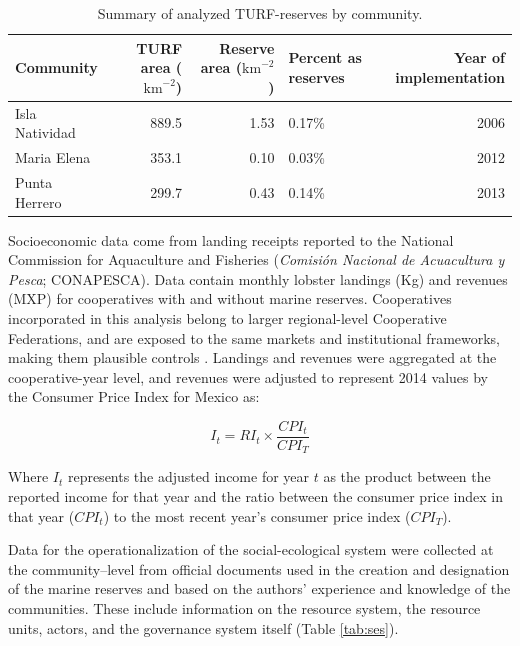 \documentclass{frontiersSCNS}
\theoremstyle{definition}
\theoremstyle{definition}
\theoremstyle{definition}
\theoremstyle{remark}
\begin{document}
\clearpage

\begin{table}[H]

\caption{\label{tab:unnamed-chunk-2}\label{table:com_sum} Summary of analyzed TURF-reserves by community.}
\centering
\begin{tabular}[t]{l|r|r|l|r}
\hline
Community & TURF area ($\mathrm{km}^{-2}$) & Reserve area ($\mathrm{km}^{-2}$) & Percent as reserves & Year of implementation\\
\hline
Isla Natividad & 889.5 & 1.53 & 0.17\% & 2006\\
\hline
Maria Elena & 353.1 & 0.10 & 0.03\% & 2012\\
\hline
Punta Herrero & 299.7 & 0.43 & 0.14\% & 2013\\
\hline
\end{tabular}
\end{table}

Socioeconomic data come from landing receipts reported to the National
Commission for Aquaculture and Fisheries (\emph{Comisión Nacional de
Acuacultura y Pesca}; CONAPESCA). Data contain monthly lobster landings
(Kg) and revenues (MXP) for cooperatives with and without marine
reserves. Cooperatives incorporated in this analysis belong to larger
regional-level Cooperative Federations, and are exposed to the same
markets and institutional frameworks, making them plausible controls
\citep{mccay_2017-1m,ayer_2018}. Landings and revenues were aggregated
at the cooperative-year level, and revenues were adjusted to represent
2014 values by the Consumer Price Index for Mexico \citep{oecd_2017-VV}
as:

\begin{equation}
I_t = RI_t\times\frac{CPI_t}{CPI_T}
\label{eqn:cpi}
\end{equation}

Where \(I_t\) represents the adjusted income for year \(t\) as the
product between the reported income for that year and the ratio between
the consumer price index in that year (\(CPI_t\)) to the most recent
year's consumer price index (\(CPI_T\)).

Data for the operationalization of the social-ecological system were
collected at the community--level from official documents used in the
creation and designation of the marine reserves
\citep{dof_website_2012,dof_website_2013,dof_website_2018} and based on
the authors' experience and knowledge of the communities. These include
information on the resource system, the resource units, actors, and the
governance system itself (Table \ref{tab:ses}).
\end{document}
